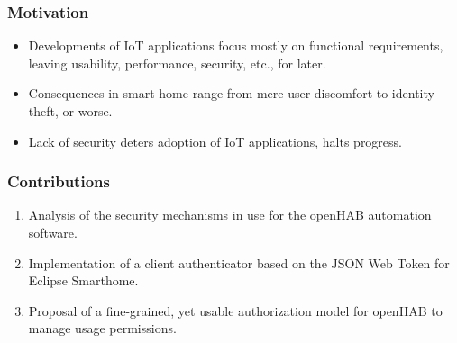 \documentclass{beamer}
\begin{document}
\begin{frame}
\frametitle{Motivation}
\begin{itemize}
  \setlength\itemsep{1.5em}
\item Developments of IoT applications focus mostly on functional requirements, leaving usability, performance, security, etc., for later.
\item Consequences in smart home range from mere user discomfort to identity theft, or worse.
\item Lack of security deters adoption of IoT applications, halts progress. 
\end{itemize}
\end{frame}
\begin{frame}
\frametitle{Contributions} %
\begin{enumerate}
  \setlength\itemsep{1.5em}
\item Analysis of the security mechanisms in use for the openHAB automation software.
\item Implementation of a client authenticator based on the JSON Web Token for Eclipse Smarthome.
\item Proposal of a fine-grained, yet usable authorization model for openHAB to manage usage permissions.
\end{enumerate}
\end{frame}
\end{document}

